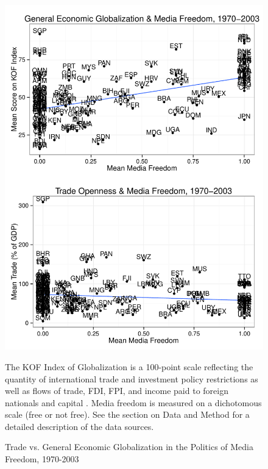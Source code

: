 \documentclass[a4paper]{article}\usepackage[]{graphicx}\usepackage[]{color}
\newenvironment{knitrout}{}{} %
\begin{document}
\pagebreak
\begin{figure}[t]
    \caption{Trade vs. General Economic Globalization in the Politics of Media Freedom, 1970-2003}
    \label{absolute}
    \begin{center}

\begin{knitrout}
\color{fgcolor}

{\centering \includegraphics[width=0.8\linewidth]{figures/intrographs} 

}



\end{knitrout}


    \end{center}
    \begin{singlespace}
        {\scriptsize{The KOF Index of Globalization is a 100-point scale reflecting the quantity of international trade and investment policy restrictions as well as flows of trade, FDI, FPI, and income paid to foreign nationals and capital \parencite[43]{Dreher:2008dg}. Media freedom is measured on a dichotomous scale (free or not free). See the section on Data and Method for a detailed description of the data sources. 
                      }}
    \end{singlespace}
\end{figure}
\end{document}
